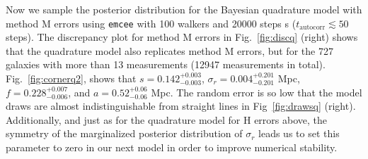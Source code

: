 \documentclass[a4paper,fleqn,usenatbib]{mnras}
\begin{document}
Now we sample the posterior distribution for the Bayesian quadrature model with method M errors using \texttt{emcee} with 100 walkers and 20000 steps s ($t_\mathrm{autocorr} \lesssim 50$ steps). The discrepancy plot for method M errors in Fig.~\ref{fig:discq} (right) shows that the quadrature model also replicates method M errors, but for the 727 galaxies with more than 13 measurements (12947 measurements in total). Fig.~\ref{fig:cornerq2}, shows that $s=0.142_{-0.003}^{+0.003}$, $\sigma_r=0.004_{-0.201}^{+0.201}$ Mpc, $f=0.228_{-0.006}^{+0.007}$, and $a=0.52_{-0.06}^{+0.06}$ Mpc. The random error is so low that the model draws are almost indistinguishable from straight lines in Fig~\ref{fig:drawsq} (right). Additionally, and just as for the quadrature model for H errors above, the symmetry of the marginalized posterior distribution of $\sigma_r$ leads us to set this parameter to zero in our next model in order to improve numerical stability.
\end{document}
